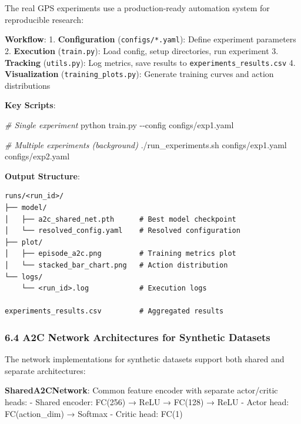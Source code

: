 \documentclass[
  10pt,
  twocolumn,
]{article}
\newenvironment{Shaded}{}{}
\newcommand{\AttributeTok}[1]{\textcolor[rgb]{0.49,0.56,0.16}{#1}}
\newcommand{\CommentTok}[1]{\textcolor[rgb]{0.38,0.63,0.69}{\textit{#1}}}
\newcommand{\ExtensionTok}[1]{#1}
\newcommand{\NormalTok}[1]{#1}
\begin{document}
The real GPS experiments use a production-ready automation system for
reproducible research:

\textbf{Workflow}: 1. \textbf{Configuration} (\texttt{configs/*.yaml}):
Define experiment parameters 2. \textbf{Execution} (\texttt{train.py}):
Load config, setup directories, run experiment 3. \textbf{Tracking}
(\texttt{utils.py}): Log metrics, save results to
\texttt{experiments\_results.csv} 4. \textbf{Visualization}
(\texttt{training\_plots.py}): Generate training curves and action
distributions

\textbf{Key Scripts}:

\begin{Shaded}
	\begin{Highlighting}[]
		\CommentTok{\# Single experiment}
		\ExtensionTok{python}\NormalTok{ train.py }\AttributeTok{{-}{-}config}\NormalTok{ configs/exp1.yaml}

		\CommentTok{\# Multiple experiments (background)}
		\ExtensionTok{./run\_experiments.sh}\NormalTok{ configs/exp1.yaml configs/exp2.yaml}
	\end{Highlighting}
\end{Shaded}

\textbf{Output Structure}:

\begin{verbatim}
runs/<run_id>/
├── model/
│   ├── a2c_shared_net.pth      # Best model checkpoint
│   └── resolved_config.yaml    # Resolved configuration
├── plot/
│   ├── episode_a2c.png         # Training metrics plot
│   └── stacked_bar_chart.png   # Action distribution
└── logs/
    └── <run_id>.log            # Execution logs

experiments_results.csv         # Aggregated results
\end{verbatim}

\hypertarget{a2c-network-architectures-for-synthetic-datasets}{%
	\subsubsection{6.4 A2C Network Architectures for Synthetic
		Datasets}\label{a2c-network-architectures-for-synthetic-datasets}}

The network implementations for synthetic datasets support both shared
and separate architectures:

\textbf{SharedA2CNetwork}: Common feature encoder with separate
actor/critic heads: - Shared encoder: FC(256) → ReLU → FC(128) → ReLU -
Actor head: FC(action\_dim) → Softmax - Critic head: FC(1)
\end{document}
